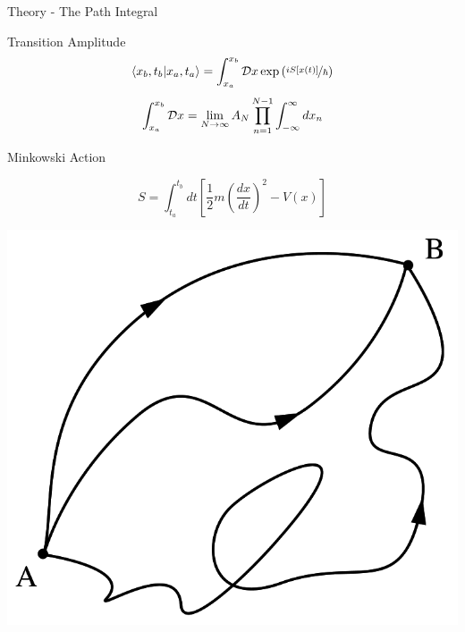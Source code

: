 \documentclass{beamer}
\begin{document}
\begin{frame}{Theory - The Path Integral}
    {
       \begin{block}{Transition Amplitude}
            {
                \begin{equation}
                    \braket{x_b,t_b|x_a,t_a} = \int^{x_b}_{x_a} {\cal D}{x} \exp{\left(\nicefrac{iS\left[{x\left(t\right)}\right]}{\hbar}\right)}
                \end{equation}
            }
            {
                \begin{equation}
                \int^{x_b}_{x_a} {\cal D}{x} = \lim_{N \to \infty} A_N \prod_{n=1}^{N-1} \int^{\infty}_{- \infty} d x_n
                \end{equation}
            }
        \end{block}
    }
    {
        \begin{block}{Minkowski Action}
            
            \begin{equation}
                    S = \int^{t_b}_{t_a}dt \left[\frac{1}{2}m\left(\frac{dx}{dt}\right)^2 - V(x)\right]
            \end{equation}
            
        \end{block}
    }
    {
        \centering
        \includegraphics[scale=0.2]{DataForPresentation/PathIntegralSmooth.png}
    }
\end{frame}
\end{document}
